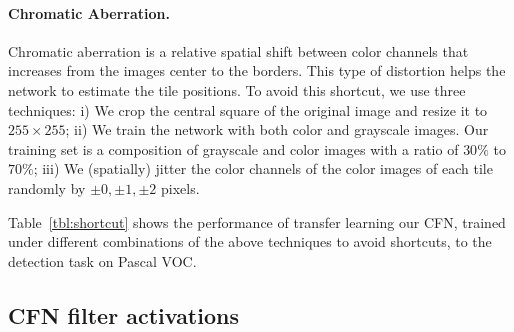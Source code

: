 \documentclass[runningheads]{llncs}
\begin{document}
\paragraph{Chromatic Aberration.} Chromatic aberration is a relative spatial shift between color channels that increases from the images center to the borders. This type of distortion helps the network to estimate the tile positions. To avoid this shortcut, we use three techniques: i) We crop the central square of the original image and resize it to $255 \times 255$; ii) We train the network with both color and grayscale images. Our training set is a composition of grayscale and color images with a ratio of $30\%$ to $70\%$; iii) We (spatially) jitter the color channels of the color images of each tile randomly by ${\pm 0,\pm 1,\pm 2}$ pixels.

 \vspace{.5em}
Table~\ref{tbl:shortcut} shows the performance of transfer learning our CFN, trained under different combinations of the above techniques to avoid shortcuts, to the detection task on Pascal VOC.


\subsection{CFN filter activations} 
\end{document}
